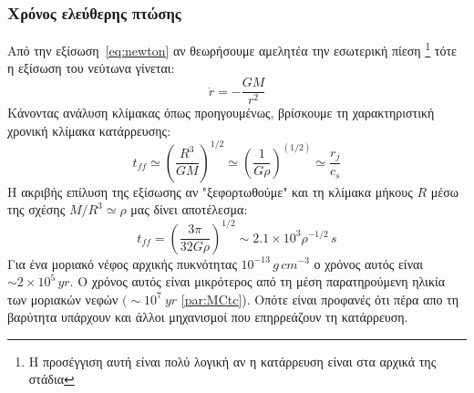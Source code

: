 \documentclass[a4paper,12pt]{memoir}
\begin{document}
\subsubsection{Χρόνος ελεύθερης πτώσης}
\label{par:freefall}
Από την εξίσωση~\ref{eq:newton} αν θεωρήσουμε αμελητέα την εσωτερική πίεση \footnote{H προσέγγιση αυτή είναι πολύ λογική αν η κατάρρευση είναι στα αρχικά της στάδια} τότε η εξίσωση του νεύτωνα γίνεται:
\begin{equation}
\ddot{r}=-\frac{GM}{r^2}
\end{equation}
Κάνοντας ανάλυση κλίμακας όπως προηγουμένως, βρίσκουμε τη χαρακτηριστική χρονική κλίμακα κατάρρευσης:
\begin{equation}
t_{ff}\simeq \left(\frac{R^3}{GM}\right)^{1/2} \simeq \left( \frac{1}{G \rho}\right) ^(1/2) \simeq \frac{r_j}{c_s} 
\end{equation}
Η ακριβής επίλυση της εξίσωσης αν "ξεφορτωθούμε" και τη κλίμακα μήκους $R$ μέσω της σχέσης $M/R^3 \simeq \rho$ μας δίνει αποτέλεσμα:
\begin{equation}
t_{ff}=\left( \frac{3 \pi}{32 G \rho}\right) ^{1/2} \sim 2.1\times 10^3 \rho ^{-1/2} \, s
\end{equation}
Για ένα μοριακό νέφος αρχικής πυκνότητας $10^{-13}\, g\,cm^{-3}$ ο χρόνος αυτός είναι $\sim 2\times 10^5 \, yr$. Ο χρόνος αυτός είναι μικρότερος από τη μέση παρατηρούμενη ηλικία των μοριακών νεφών $(\sim 10^7\ yr$ \ref{par:MCtc}). Οπότε είναι προφανές ότι πέρα απο τη βαρύτητα υπάρχουν και άλλοι μηχανισμοί που επηρρεάζουν τη κατάρρευση.
\end{document}
